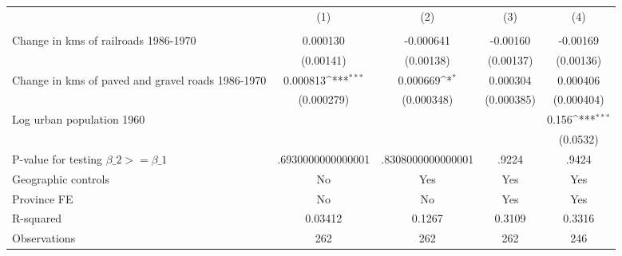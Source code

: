 {
\def\sym#1{\ifmmode^{#1}\else\(^{#1}\)\fi}
\begin{tabular}{l*{4}{c}}
\hline\hline
                &\multicolumn{1}{c}{(1)}&\multicolumn{1}{c}{(2)}&\multicolumn{1}{c}{(3)}&\multicolumn{1}{c}{(4)}\\
                &\multicolumn{1}{c}{}&\multicolumn{1}{c}{}&\multicolumn{1}{c}{}&\multicolumn{1}{c}{}\\
\hline
Change in kms of railroads 1986-1970& 0.000130         &-0.000641         & -0.00160         & -0.00169         \\
                &(0.00141)         &(0.00138)         &(0.00137)         &(0.00136)         \\
[1em]
Change in kms of paved and gravel roads 1986-1970& 0.000813\sym{***}& 0.000669\sym{*}  & 0.000304         & 0.000406         \\
                &(0.000279)         &(0.000348)         &(0.000385)         &(0.000404)         \\
[1em]
Log urban population 1960&                  &                  &                  &    0.156\sym{***}\\
                &                  &                  &                  & (0.0532)         \\
\hline
P-value for testing $\beta\_{2} >= \beta\_{1}$&.6930000000000001         &.8308000000000001         &    .9224         &    .9424         \\
Geographic controls&       No         &      Yes         &      Yes         &      Yes         \\
Province FE     &       No         &       No         &      Yes         &      Yes         \\
R-squared       &  0.03412         &   0.1267         &   0.3109         &   0.3316         \\
Observations    &      262         &      262         &      262         &      246         \\
\hline\hline
\end{tabular}
}
